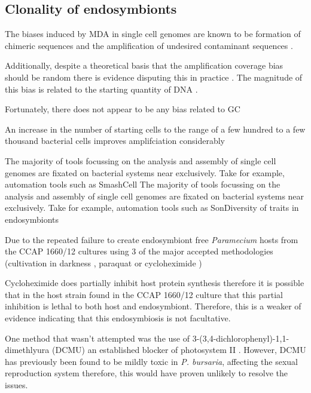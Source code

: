 \subsection{Clonality of endosymbionts}

The biases induced by MDA in single cell genomes are known to be 
formation of chimeric sequences and the amplification
of undesired contaminant sequences \citep{Binga2008}.

Additionally, despite a theoretical basis that
the amplification coverage bias should be random \citep{Hosono2003}
there is evidence disputing this in practice \citep{Ellegaard2013}.
The magnitude of this bias is related to the starting
quantity of DNA \citep{Ellegaard2013a}.

Fortunately, there does not appear to be any bias
related to GC \citep{Ellegaard2013a}


An increase in the number of starting cells to the range of
a few hundred to a few thousand bacterial cells
improves amplifciation considerably \citep{Ellegaard2013a}



The majority of tools focussing on the analysis
and assembly of single cell genomes are fixated
on bacterial systems near exclusively. Take for example,
automation tools such as SmashCell 
The majority of tools focussing on the analysis
and assembly of single cell genomes are fixated
on bacterial systems near exclusively. Take for example,
automation tools such as Son{Diversity of traits in endosymbionts}

Due to the repeated failure to create endosymbiont free \textit{Paramecium}
hosts from the CCAP 1660/12 cultures using 3 of the major accepted
methodologies (cultivation in darkness \citep{Karakashian1963},
paraquat \citep{Hosoya1995a,Tanaka2002} or cycloheximide \citep{Weis1984effect})




Cycloheximide does partially inhibit host protein synthesis
\citep{Weis1984effect,Kodama2007,Kodama2008,Kodama2009a}
therefore it is possible that in the host strain found in the
CCAP 1660/12 culture that this partial inhibition is lethal to both
host and endosymbiont. 
Therefore, this is a weaker of evidence indicating that this
endosymbiosis is not facultative. 






One method that wasn't attempted was the use of 3-(3,4-dichlorophenyl)-1,1-dimethlyura (DCMU)
an established blocker of photosystem II \citep{Reisser1976}. 
However, DCMU has previously been found to be mildly toxic in \textit{P. bursaria}, 
affecting the sexual reproduction system \citep{Miwa2009} therefore, this would
have proven unlikely to resolve the issues.






